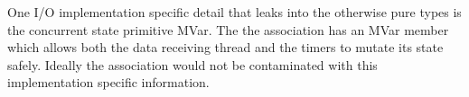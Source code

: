 One I/O implementation specific detail that leaks into the otherwise pure types is the concurrent state primitive MVar. The the association has an MVar member which allows both the data receiving thread and the timers to mutate its state safely. Ideally the association would not be contaminated with this implementation specific information.




